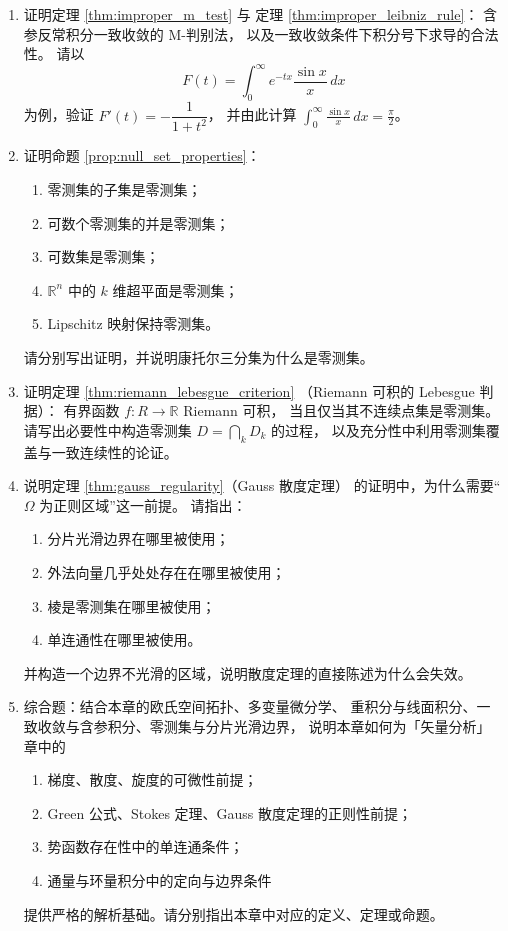 \begin{enumerate}[leftmargin=3em, label=\textbf{题 \arabic*}]
    \item 证明定理 \ref{thm:improper_m_test} 与
    定理 \ref{thm:improper_leibniz_rule}：
    含参反常积分一致收敛的 M-判别法，
    以及一致收敛条件下积分号下求导的合法性。
    请以
    \[
    F(t)=\int_0^\infty e^{-tx}\frac{\sin x}{x}\,dx
    \]
    为例，验证 $F'(t)=-\dfrac{1}{1+t^2}$，
    并由此计算 $\displaystyle\int_0^\infty\frac{\sin x}{x}\,dx=\frac{\pi}{2}$。

    \item 证明命题 \ref{prop:null_set_properties}：
    \begin{enumerate}[label=(\roman*)]
        \item 零测集的子集是零测集；
        \item 可数个零测集的并是零测集；
        \item 可数集是零测集；
        \item $\mathbb{R}^n$ 中的 $k$ 维超平面是零测集；
        \item Lipschitz 映射保持零测集。
    \end{enumerate}
    请分别写出证明，并说明康托尔三分集为什么是零测集。

    \item 证明定理 \ref{thm:riemann_lebesgue_criterion}
    （Riemann 可积的 Lebesgue 判据）：
    有界函数 $f:R\to\mathbb{R}$ Riemann 可积，
    当且仅当其不连续点集是零测集。
    请写出必要性中构造零测集 $D=\bigcap_k D_k$ 的过程，
    以及充分性中利用零测集覆盖与一致连续性的论证。

    \item 说明定理 \ref{thm:gauss_regularity}（Gauss 散度定理）
    的证明中，为什么需要“$\Omega$ 为正则区域”这一前提。
    请指出：
    \begin{enumerate}[label=(\roman*)]
        \item 分片光滑边界在哪里被使用；
        \item 外法向量几乎处处存在在哪里被使用；
        \item 棱是零测集在哪里被使用；
        \item 单连通性在哪里被使用。
    \end{enumerate}
    并构造一个边界不光滑的区域，说明散度定理的直接陈述为什么会失效。

    \item 综合题：结合本章的欧氏空间拓扑、多变量微分学、
    重积分与线面积分、一致收敛与含参积分、零测集与分片光滑边界，
    说明本章如何为「矢量分析」章中的
    \begin{enumerate}[label=(\roman*)]
        \item 梯度、散度、旋度的可微性前提；
        \item Green 公式、Stokes 定理、Gauss 散度定理的正则性前提；
        \item 势函数存在性中的单连通条件；
        \item 通量与环量积分中的定向与边界条件
    \end{enumerate}
    提供严格的解析基础。请分别指出本章中对应的定义、定理或命题。

\end{enumerate}

